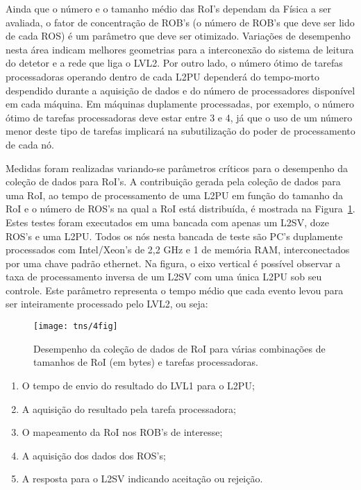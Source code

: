 Ainda que o número e o tamanho médio das RoI's dependam da Física a ser
avaliada, o fator de concentração de ROB's (o número de ROB's que deve ser
lido de cada ROS) é um parâmetro que deve ser otimizado. Variações de
desempenho nesta área indicam melhores geometrias para a interconexão do
sistema de leitura do detetor e a rede que liga o LVL2. Por outro lado, o
número ótimo de tarefas processadoras operando dentro de cada L2PU dependerá
do tempo-morto despendido durante a aquisição de dados e do número de
processadores disponível em cada máquina. Em máquinas duplamente processadas,
por exemplo, o número ótimo de tarefas processadoras deve estar entre 3 e 4,
já que o uso de um número menor deste tipo de tarefas implicará na
subutilização do poder de processamento de cada nó.

Medidas foram realizadas variando-se parâmetros críticos para o desempenho da
coleção de dados para RoI's. A contribuição gerada pela coleção de dados para
uma RoI, ao tempo de processamento de uma L2PU em função do tamanho da RoI e o
número de ROS's na qual a RoI está distribuída, é mostrada na
Figura~\ref{fig:tns-4fig}. Estes testes foram executados em uma bancada com
apenas um L2SV, doze ROS's e uma L2PU. Todos os nós nesta bancada de teste são
PC's duplamente processados com Intel/Xeon's de 2,2 GHz e 1  de
memória RAM, interconectados por uma chave padrão  ethernet. Na
figura, o eixo vertical é possível observar a taxa de processamento inversa de
um L2SV com uma única L2PU sob seu controle. Este parâmetro representa o tempo
médio que cada evento levou para ser inteiramente processado pelo LVL2, ou
seja:

\begin{figure}
\begin{center}
\texttt{[image: tns/4fig]}
\end{center}
\caption{Desempenho da coleção de dados de RoI para várias combinações de
tamanhos de RoI (em bytes) e tarefas processadoras.}
\label{fig:tns-4fig}
\end{figure}

\begin{enumerate}
\item O tempo de envio do resultado do LVL1 para o L2PU;
\item A aquisição do resultado pela tarefa processadora;
\item O mapeamento da RoI nos ROB's de interesse;
\item A aquisição dos dados dos ROS's;
\item A resposta para o L2SV indicando aceitação ou rejeição.
\end{enumerate}

